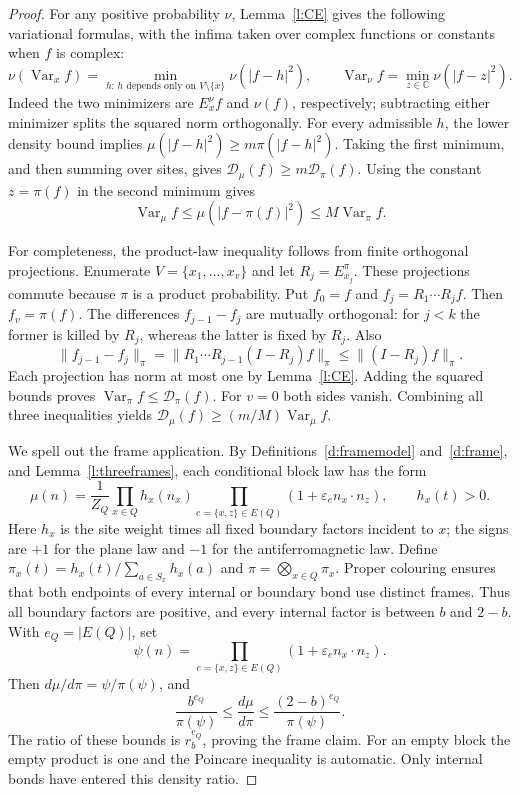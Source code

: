 \begin{proof}
For any positive probability \(\nu\), Lemma~\ref{l:CE} gives the
following variational formulas, with the infima taken over complex
functions or constants when \(f\) is complex:
\[
 \nu(\operatorname{Var}_x f)
   =\min_{h:\,h\text{ depends only on }V\setminus\{x\}}
                      \nu(|f-h|^2),\qquad
 \operatorname{Var}_\nu f=\min_{z\in\mathbb C}\nu(|f-z|^2).
\]
Indeed the two minimizers are \(E_x^\nu f\) and \(\nu(f)\),
respectively; subtracting either minimizer splits the squared norm
orthogonally.  For every admissible \(h\), the lower density bound
implies \(\mu(|f-h|^2)\ge m\pi(|f-h|^2)\).
Taking the first minimum, and then summing over sites, gives
\(\mathcal D_\mu(f)\ge m\mathcal D_\pi(f)\).
Using the constant \(z=\pi(f)\) in the second minimum gives
\[
 \operatorname{Var}_\mu f\le\mu(|f-\pi(f)|^2)
                         \le M\operatorname{Var}_\pi f.
\]

For completeness, the product-law inequality follows from finite
orthogonal projections.  Enumerate \(V=\{x_1,\ldots,x_v\}\) and let
\(R_j=E_{x_j}^\pi\).  These projections commute because \(\pi\) is
a product probability.  Put \(f_0=f\) and
\(f_j=R_1\cdots R_jf\).  Then \(f_v=\pi(f)\).
The differences \(f_{j-1}-f_j\) are mutually orthogonal: for \(j<k\)
the former is killed by \(R_j\), whereas the latter is fixed by
\(R_j\).  Also
\[
 \|f_{j-1}-f_j\|_\pi
   =\|R_1\cdots R_{j-1}(I-R_j)f\|_\pi
   \le\|(I-R_j)f\|_\pi.
\]
Each projection has norm at most one by Lemma~\ref{l:CE}.
Adding the squared bounds proves
\(\operatorname{Var}_\pi f\le\mathcal D_\pi(f)\).
For \(v=0\) both sides vanish.  Combining all three inequalities
yields
\(\mathcal D_\mu(f)\ge(m/M)\operatorname{Var}_\mu f\).

We spell out the frame application.  By
Definitions~\ref{d:framemodel} and~\ref{d:frame}, and
Lemma~\ref{l:threeframes}, each conditional block law has the form
\[
 \mu(n)=\frac1{Z_Q}
       \prod_{x\in Q}h_x(n_x)
       \prod_{e=\{x,z\}\in E(Q)}(1+\varepsilon_e n_x\cdot n_z),
 \qquad h_x(t)>0.
\]
Here \(h_x\) is the site weight times all fixed boundary factors
incident to \(x\); the signs are \(+1\) for the plane law and
\(-1\) for the antiferromagnetic law.  Define
\(\pi_x(t)=h_x(t)/\sum_{a\in S_x}h_x(a)\) and
\(\pi=\bigotimes_{x\in Q}\pi_x\).
Proper colouring ensures that both endpoints of every internal or
boundary bond use distinct frames.  Thus all boundary factors are
positive, and every internal factor is between \(b\) and \(2-b\).
With \(e_Q=|E(Q)|\), set
\[
 \psi(n)=\prod_{e=\{x,z\}\in E(Q)}
                     (1+\varepsilon_e n_x\cdot n_z).
\]
Then \(d\mu/d\pi=\psi/\pi(\psi)\), and
\[
 \frac{b^{e_Q}}{\pi(\psi)}
      \le\frac{d\mu}{d\pi}
      \le\frac{(2-b)^{e_Q}}{\pi(\psi)}.
\]
The ratio of these bounds is \(r_b^{e_Q}\), proving the frame claim.
For an empty block the empty product is one and the Poincare inequality
is automatic.  Only internal bonds have entered this density ratio.
\end{proof}

